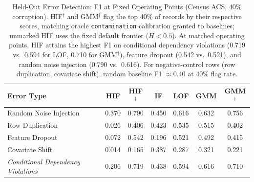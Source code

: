 \documentclass[pdflatex,sn-mathphys-num]{sn-jnl}
\theoremstyle{thmstyleone}%
\theoremstyle{thmstyletwo}%
\theoremstyle{thmstylethree}%
\begin{document}
\begin{table}[htbp]
\centering
\caption{Held-Out Error Detection: F1 at Fixed Operating Points (Census ACS, 40\% corruption). HIF$^{\dagger}$ and GMM$^{\dagger}$ flag the top 40\% of records by their respective scores, matching oracle \texttt{contamination} calibration granted to baselines; unmarked HIF uses the fixed default frontier ($H < 0.5$). At matched operating points, HIF attains the highest F1 on conditional dependency violations (0.719 vs.\ 0.594 for LOF, 0.710 for GMM$^{\dagger}$), feature dropout (0.542 vs.\ 0.521), and random noise injection (0.790 vs.\ 0.616). For negative-control rows (row duplication, covariate shift), random baseline F1 $\approx 0.40$ at 40\% flag rate.}
\label{tab:heldout_f1}
\footnotesize
\setlength{\tabcolsep}{2pt}
\begin{tabular}{@{}lcccccc@{}}
\toprule
\textbf{Error Type} & \textbf{HIF} & \textbf{HIF$^{\dagger}$} & \textbf{IF} & \textbf{LOF} & \textbf{GMM} & \textbf{GMM$^{\dagger}$} \\
\midrule
Random Noise Injection & 0.370 & 0.790 & 0.450 & 0.616 & 0.632 & 0.756 \\
Row Duplication & 0.026 & 0.406 & 0.423 & 0.535 & 0.515 & 0.402 \\
Feature Dropout & 0.072 & 0.542 & 0.196 & 0.521 & 0.492 & 0.415 \\
Covariate Shift & 0.014 & 0.165 & 0.387 & 0.287 & 0.321 & 0.221 \\
\midrule
\textit{Conditional Dependency Violations} & 0.206 & 0.719 & 0.438 & 0.594 & 0.616 & 0.710 \\
\bottomrule
\end{tabular}
\end{table}
\end{document}

